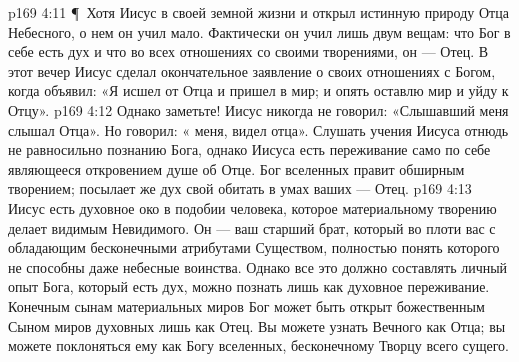 \vs p169 4:11 \P\ Хотя Иисус в своей земной жизни и открыл истинную природу Отца Небесного, о нем он учил мало. Фактически он учил лишь двум вещам: что Бог в себе есть дух и что во всех отношениях со своими творениями, он --- Отец. В этот вечер Иисус сделал окончательное заявление о своих отношениях с Богом, когда объявил: «Я исшел от Отца и пришел в мир; и опять оставлю мир и уйду к Отцу».
\vs p169 4:12 Однако заметьте! Иисус никогда не говорил: «Слышавший меня слышал Отца». Но говорил: « меня, видел отца». Слушать учения Иисуса отнюдь не равносильно познанию Бога, однако  Иисуса есть переживание само по себе являющееся откровением душе об Отце. Бог вселенных правит обширным творением; посылает же дух свой обитать в умах ваших --- Отец.
\vs p169 4:13 Иисус есть духовное око в подобии человека, которое материальному творению делает видимым Невидимого. Он --- ваш старший брат, который во плоти  вас с обладающим бесконечными атрибутами Существом, полностью понять которого не способны даже небесные воинства. Однако все это должно составлять личный опыт  Бога, который есть дух, можно познать лишь как духовное переживание. Конечным сынам материальных миров Бог может быть открыт божественным Сыном миров духовных лишь как Отец. Вы можете узнать Вечного как Отца; вы можете поклоняться ему как Богу вселенных, бесконечному Творцу всего сущего.

